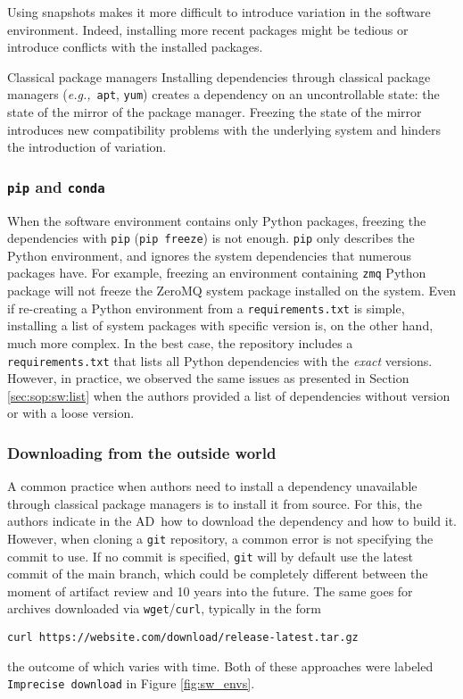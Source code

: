 \documentclass[sigconf,natbib=false]{acmart}
\newcommand{\eg}{\emph{e.g.,}}
\newcommand{\ad}{AD}
\begin{document}
Using snapshots makes it more difficult to introduce variation in the software environment.
Indeed, installing more recent packages might be tedious or introduce conflicts with the installed packages.

\begin{lesson}{Classical package managers}{}
  Installing dependencies through classical package managers (\eg\ \texttt{apt}, \texttt{yum}) creates a dependency on an uncontrollable state: the state of the mirror of the package manager.
  Freezing the state of the mirror introduces new compatibility problems with the underlying system and hinders the introduction of variation.
\end{lesson}

\subsubsection{\texttt{pip} and \texttt{conda}}

When the software environment contains only Python packages, freezing the dependencies with \texttt{pip} (\texttt{pip freeze}) is not enough.
\texttt{pip} only describes the Python environment, and ignores the system dependencies that numerous packages have. 
For example, freezing an environment containing \texttt{zmq} Python package will not freeze the ZeroMQ system package installed on the system.  
Even if re-creating a Python environment from a \texttt{requirements.txt} is simple, installing a list of system packages with specific version is, on the other hand, much more complex.
In the best case, the repository includes a \texttt{requirements.txt} that lists all Python dependencies with the \emph{exact} versions.
However, in practice, we observed the same issues as presented in Section \ref{sec:sop:sw:list} when the authors provided a list of dependencies without version or with a loose version.

\subsubsection{Downloading from the outside world}

A common practice when authors need to install a dependency unavailable through classical package managers is to install it from source.
For this, the authors indicate in the \ad\ how to download the dependency and how to build it.
However, when cloning a \texttt{git} repository, a common error is not specifying the commit to use.
If no commit is specified, \texttt{git} will by default use the latest commit of the main branch, which could be completely different between the moment of artifact review and 10 years into the future.
The same goes for archives downloaded via \texttt{wget}/\texttt{curl}, typically in the form
\begin{verbatim}
curl https://website.com/download/release-latest.tar.gz
\end{verbatim}
the outcome of which varies with time.
Both of these approaches were labeled \texttt{Imprecise download} in Figure \ref{fig:sw_envs}.
\end{document}

